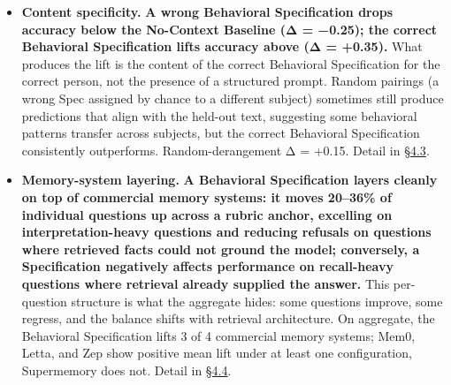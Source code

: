\begin{itemize}
{  75\% of what the raw corpus delivers at \textasciitilde25× less
  context on average (per-subject range 7× to 79×).} A 7,000-token
  structured representation matches most of the predictive accuracy of
  a 163,000-token raw corpus. A Behavioral Specification selects and
  structures the behavioral signal; the interpretive layer drives the
  result, not the volume of context. Spec Only +0.68 vs.~raw corpus
  +0.91 over baseline.\footnote{The +0.68 and +0.91 figures are 9-row
    low-baseline-band per-subject-mean Δs. Earlier drafts reported +0.71
    and +0.93 on an asymmetric 8-row baseline; v12.1 standardizes to the
    symmetric 9-row computation. Full recompute, both grains, and the
    Bābur C9 carve-out are in Appendix B.9.} On Hamerton (smallest
  corpus tested), the
  Behavioral Specification scores higher than the raw corpus (2.63
  vs.~2.27). Detail in \hyperref[compression-structure-vs.-raw-text]{§4.2}.
\item
  \textbf{Content specificity.} \textbf{A wrong Behavioral Specification
  drops accuracy below the No-Context Baseline (Δ = −0.25); the correct
  Behavioral Specification lifts accuracy above (Δ = +0.35).} What
  produces the lift is the content of the correct
  Behavioral Specification for the correct person, not the presence of a
  structured prompt. Random pairings (a wrong Spec assigned by chance to
  a different subject) sometimes still produce predictions that align
  with the held-out text, suggesting some behavioral patterns transfer
  across subjects, but the correct Behavioral Specification consistently
  outperforms. Random-derangement Δ = +0.15. Detail in \hyperref[mechanism-correct-content-not-format]{§4.3}.
\item
  \textbf{Memory-system layering.} \textbf{A Behavioral Specification
  layers cleanly on top of commercial memory systems: it moves 20--36\%
  of individual questions up across a rubric anchor, excelling on
  interpretation-heavy questions and reducing refusals on questions
  where retrieved facts could not ground the model; conversely, a
  Specification negatively affects performance on recall-heavy questions
  where retrieval already supplied the answer.} This per-question
  structure is what the aggregate hides: some questions improve, some
  regress, and the balance shifts with retrieval architecture. On
  aggregate, the Behavioral Specification lifts 3 of 4 commercial memory
  systems; Mem0, Letta, and Zep show positive mean lift under at least
  one configuration, Supermemory does not. Detail in \hyperref[memory-system-composition]{§4.4}.

\end{itemize}
